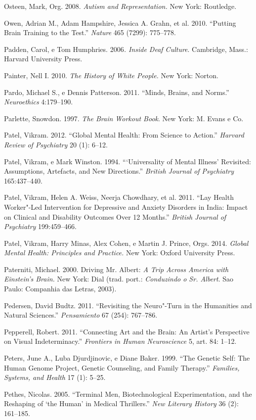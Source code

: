 {\begin{Parskip}
Osteen, Mark, Org. 2008. \emph{Autism and Representation.} New York:
Routledge.

Owen, Adrian M., Adam Hampshire, Jessica A. Grahn, et al. 2010.
``Putting Brain Training to the Test.'' \emph{Nature} 465 (7299):
775--778.

Padden, Carol, e Tom Humphries. 2006\emph{. Inside Deaf Culture}.
Cambridge, Mass.: Harvard University Press.

Painter, Nell I. 2010. \emph{The History of White People.} New York:
Norton.

Pardo, Michael S., e Dennis Patterson. 2011. ``Minds, Brains, and
Norms.'' \emph{Neuroethics} 4:179--190.

Parlette, Snowdon. 1997. \emph{The Brain Workout Book}. New York: M.
Evans e Co.

Patel, Vikram. 2012. ``Global Mental Health: From Science to Action.''
\emph{Harvard Review of Psychiatry} 20 (1): 6--12.

Patel, Vikram, e Mark Winston. 1994. ```Universality of Mental Illness'
Revisited: Assumptions, Artefacts, and New Directions.'' \emph{British
Journal of Psychiatry} 165:437--440.

Patel, Vikram, Helen A. Weiss, Neerja Chowdhary, et al. 2011. ``Lay
Health Worker"-Led Intervention for Depressive and Anxiety Disorders in
India: Impact on Clinical and Disability Outcomes Over 12 Months.''
\emph{British Journal of Psychiatry} 199:459--466.

Patel, Vikram, Harry Minas, Alex Cohen, e Martin J. Prince, Orgs. 2014.
\emph{Global Mental Health: Principles and Practice.} New York: Oxford
University Press.

Paterniti, Michael. 2000. Driving Mr. Albert: \emph{A Trip Across
America with Einstein's Brain.} New York: Dial (trad. port.:
\emph{Conduzindo o Sr. Albert}. Sao Paulo: Companhia das Letras, 2003).

Pedersen, David Budtz. 2011. ``Revisiting the Neuro"-Turn in the
Humanities and Natural Sciences.'' \emph{Pensamiento} 67 (254):
767--786.

Pepperell, Robert. 2011. ``Connecting Art and the Brain: An Artist's
Perspective on Visual Indeterminacy.'' \emph{Frontiers in Human
Neuroscience} 5, art. 84: 1--12.

Peters, June A., Luba Djurdjinovic, e Diane Baker. 1999. ``The Genetic
Self: The Human Genome Project, Genetic Counseling, and Family
Therapy.'' \emph{Families, Systems, and Health} 17 (1): 5--25.

Pethes, Nicolas. 2005. ``Terminal Men, Biotechnological Experimentation,
and the Reshaping of `the Human' in Medical Thrillers.'' \emph{New
Literary History} 36 (2): 161--185.


\end{Parskip}}
